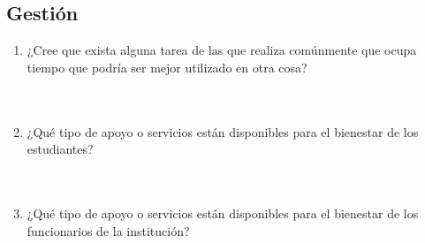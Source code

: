 \documentclass{article}
\begin{document}
\subsection*{Gestión}
\begin{enumerate}[leftmargin=*, label=\arabic*.]

    \item ¿Cree que exista alguna tarea de las que realiza comúnmente que ocupa tiempo que podría ser mejor utilizado en otra cosa? \\[0.5cm]
        \underline{\hspace{0.95\linewidth}} \vspace{0.3cm} \\
        \underline{\hspace{0.95\linewidth}} \vspace{0.3cm} \\
        \underline{\hspace{0.95\linewidth}} \vspace{0.3cm}

        \item ¿Qué tipo de apoyo o servicios están disponibles para el bienestar de los estudiantes? \\[0.5cm]
        \underline{\hspace{0.95\linewidth}} \vspace{0.3cm} \\
        \underline{\hspace{0.95\linewidth}} \vspace{0.3cm} \\
        \underline{\hspace{0.95\linewidth}} \vspace{0.3cm}
    
    \item ¿Qué tipo de apoyo o servicios están disponibles para el bienestar de los funcionarios de la institución? \\[0.5cm]
        \underline{\hspace{0.95\linewidth}} \vspace{0.3cm} \\
        \underline{\hspace{0.95\linewidth}} \vspace{0.3cm} \\
        \underline{\hspace{0.95\linewidth}} \vspace{0.3cm}


\end{enumerate}
\end{document}
